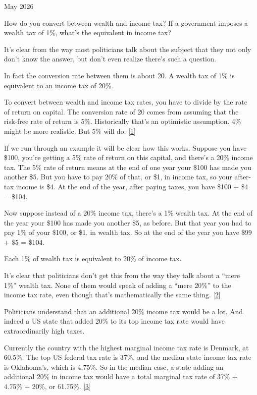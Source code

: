 May 2026

How do you convert between wealth and income tax? If a government
imposes a wealth tax of 1\%, what's the equivalent in income tax?

It's clear from the way most politicians talk about the subject that
they not only don't know the answer, but don't even realize there's such
a question.

In fact the conversion rate between them is about 20. A wealth tax of
1\% is equivalent to an income tax of 20\%.

To convert between wealth and income tax rates, you have to divide by
the rate of return on capital. The conversion rate of 20 comes from
assuming that the risk-free rate of return is 5\%. Historically that's
an optimistic assumption. 4\% might be more realistic. But 5\% will do.
{[}\hyperref[f1n]{1}{]}

If we run through an example it will be clear how this works. Suppose
you have \$100, you're getting a 5\% rate of return on this capital, and
there's a 20\% income tax. The 5\% rate of return means at the end of
one year your \$100 has made you another \$5. But you have to pay 20\%
of that, or \$1, in income tax, so your after-tax income is \$4. At the
end of the year, after paying taxes, you have \$100 + \$4 = \$104.

Now suppose instead of a 20\% income tax, there's a 1\% wealth tax. At
the end of the year your \$100 has made you another \$5, as before. But
that year you had to pay 1\% of your \$100, or \$1, in wealth tax. So at
the end of the year you have \$99 + \$5 = \$104.

Each 1\% of wealth tax is equivalent to 20\% of income tax.

It's clear that politicians don't get this from the way they talk about
a ``mere 1\%'' wealth tax. None of them would speak of adding a ``mere
20\%'' to the income tax rate, even though that's mathematically the
same thing. {[}\hyperref[f2n]{2}{]}

Politicians understand that an additional 20\% income tax would be a
lot. And indeed a US state that added 20\% to its top income tax rate
would have extraordinarily high taxes.

Currently the country with the highest marginal income tax rate is
Denmark, at 60.5\%. The top US federal tax rate is 37\%, and the median
state income tax rate is Oklahoma's, which is 4.75\%. So in the median
case, a state adding an additional 20\% in income tax would have a total
marginal tax rate of 37\% + 4.75\% + 20\%, or 61.75\%.
{[}\hyperref[f3n]{3}{]}

